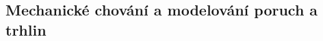 \documentclass[a4paper]{article}
\begin{document}
% 
% 

\subsection{Mechanické chování a modelování poruch a trhlin}
\end{document}
